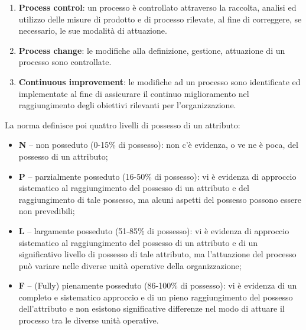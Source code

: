 {\begin{enumerate}
		  tale processo supporti efficacemente il raggiungimento di specifici obiettivi.
	    \item \textbf{Process control}: un processo è controllato attraverso la raccolta, analisi ed utilizzo delle misure di prodotto e di processo rilevate, al fine di 
		  correggere, se necessario, le sue modalità di attuazione.
	    \item \textbf{Process change}: le modifiche alla definizione, gestione, attuazione di un processo sono controllate.
	    \item \textbf{Continuous improvement}: le modifiche ad un processo sono identificate ed implementate al fine di assicurare il continuo miglioramento nel raggiungimento 
		  degli obiettivi rilevanti per l’organizzazione.
	\end{enumerate}
	
	La norma definisce poi quattro livelli di possesso di un attributo:
	\begin{itemize}
	    \item \textbf{N} -- non posseduto (0-15\% di possesso): non c’è evidenza, o ve ne è poca, del possesso di un attributo;
	    \item \textbf{P} -- parzialmente posseduto (16-50\% di possesso): vi è evidenza di approccio sistematico al raggiungimento del possesso di un attributo e del raggiungimento 
		  di tale possesso, ma alcuni aspetti del possesso possono essere non prevedibili;
	    \item \textbf{L} -- largamente posseduto (51-85\% di possesso): vi è evidenza di approccio sistematico al raggiungimento del possesso di un attributo e di un significativo livello 
		  di possesso di tale attributo, ma l’attuazione del processo può variare nelle diverse unità operative della organizzazione;
	    \item \textbf{F} -- (Fully) pienamente posseduto (86-100\% di possesso): vi è evidenza di un completo e sistematico approccio e di un pieno raggiungimento del possesso dell’attributo 
		  e non esistono significative differenze nel modo di attuare il processo tra le diverse unità operative.
	\end{itemize}

}
